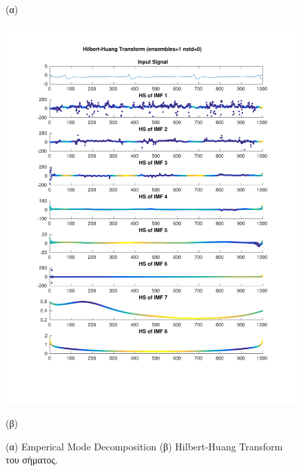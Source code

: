 \documentclass[11pt,a4paper]{article}
\begin{document}
\begin{figure}[H]
\begin{minipage}{0.48\textwidth}
	(α)
\end{minipage}
\begin{minipage}{0.48\textwidth}
	\centering
	\includegraphics[width=\textwidth]{fig/118l1_hht.pdf}
	
	(β)
\end{minipage}
\vfill
\caption{(α) Emperical Mode Decomposition (β) Hilbert-Huang Transform του σήματος.}
\label{fig:118l1_hht}
\end{figure}
\end{document}
